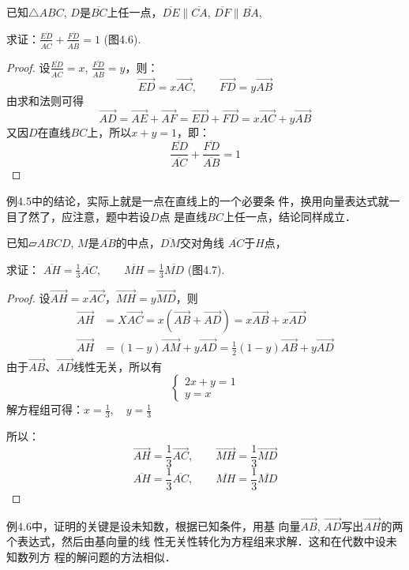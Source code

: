 \begin{example}
    已知$\triangle ABC$, $D$是$\overline{BC}$上任一点，$\overline{DE}\parallel \overline{CA}$, 
$\overline{DF}\parallel\overline{BA}$, 

求证：$\frac{\overline{ED}}{\overline{AC}}+\frac{\overline{FD}}{\overline{AB}}=1$ (图4.6).
\end{example}

\begin{proof}
设$\frac{\overline{ED}}{\overline{AC}}=x$, $\frac{\overline{FD}}{\overline{AB}}=y$，则：
\[\Vec{ED}=x\Vec{AC},\qquad \Vec{FD}=y\Vec{AB}\]
由求和法则可得
\[\Vec{AD}=\Vec{AE}+\Vec{AF}=\Vec{ED}+\Vec{FD}=x\Vec{AC}+y\Vec{AB}\]
又因$D$在直线$BC$上，所以$x+y=1$，即：
$$\frac{\overline{ED}}{\overline{AC}}+\frac{\overline{FD}}{\overline{AB}}=1$$
\end{proof}

例4.5中的结论，实际上就是一点在直线上的一个必要条
件，换用向量表达式就一目了然了，应注意，题中若设$D$点
是直线$BC$上任一点，结论同样成立．


\begin{example}
    已知$\parallelogram ABCD$, $M$是$\overline{AB}$的中点，$\overline{DM}$交对角线
$\overline{AC}$于$H$点，

求证：
$\overline{AH}=\frac{1}{3} \overline{AC},\qquad \overline{MH}=\frac{1}{3} \overline{MD}$ (图4.7).
\end{example}

\begin{proof}
设$\Vec{AH}=x\Vec{AC}$，$\Vec{MH}=y\Vec{MD}$，则
\[\begin{split}
    \Vec{AH}&=X\Vec{AC}=x\left(\Vec{AB}+\Vec{AD}\right)=x\Vec{AB}+x\Vec{AD}\\
    \Vec{AH}&=(1-y)\Vec{AM}+y\Vec{AD}=\frac{1}{2}(1-y)\Vec{AB}+y\Vec{AD}
\end{split}\]
由于$\Vec{AB}$、$\Vec{AD}$线性无关，所以有
\[\begin{cases}
    2x+y=1\\
    y=x
\end{cases}\]
解方程组可得：$x=\frac{1}{3},\quad y=\frac{1}{3}$

所以：
\[\Vec{AH}=\frac{1}{3}\Vec{AC},\qquad \Vec{MH}=\frac{1}{3}\Vec{MD}\]
\[\overline{AH}=\frac{1}{3}\overline{AC},\qquad \overline{MH}=\frac{1}{3}\overline{MD}\]
\end{proof}

例4.6中，证明的关键是设未知数，根据已知条件，用基
向量$\Vec{AB}$, $\Vec{AD}$写出$\Vec{AH}$的两个表达式，然后由基向量的线
性无关性转化为方程组来求解．这和在代数中设未知数列方
程的解问题的方法相似．

